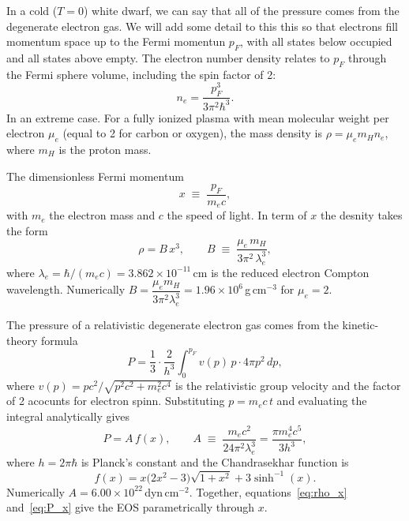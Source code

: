 \documentclass[12pt,letterpaper]{article}
\begin{document}
In a cold ($T = 0$) white dwarf, we can say that all of the pressure comes from the degenerate electron
gas. We will add some detail to this this so that electrons fill momentum space up to the Fermi momentun $p_F$, with all states below
occupied and all states above empty.
The electron number density relates to $p_F$ through the Fermi sphere volume,
including the spin factor of 2:
\begin{equation}
  n_e = \frac{p_F^3}{3\pi^2\hbar^3}.
  \label{eq:ne}
\end{equation}
In an extreme case. For a fully ionized plasma with mean molecular weight per electron $\mu_e$
(equal to 2 for carbon or oxygen), the mass density is $\rho = \mu_e m_H n_e$,
where $m_H$ is the proton mass.

The dimensionless Fermi momentum
\begin{equation}
  x \;\equiv\; \frac{p_F}{m_e c},
  \label{eq:xdef}
\end{equation}
with $m_e$ the electron mass and $c$ the speed of light.
In term of $x$ the desnity takes the form
\begin{equation}
  \rho = B\,x^3,
  \qquad
  B \;\equiv\; \frac{\mu_e\,m_H}{3\pi^2\,\lambda_e^3},
  \label{eq:rho_x}
\end{equation}
where $\lambda_e = \hbar/(m_e c) = 3.862 \times 10^{-11}$\,cm is the reduced electron
Compton wavelength.
Numerically $B = \dfrac{\mu_e m_H}{3\pi^2 \lambda_e^3} = 1.96 \times 10^6$\,g\,cm$^{-3}$ for $\mu_e = 2$.

The pressure of a relativistic degenerate electron gas comes from the kinetic-theory
formula
\begin{equation}
  P = \frac{1}{3}\cdot\frac{2}{h^3}\int_0^{p_F}
        v(p)\,p\cdot 4\pi p^2\,dp,
  \label{eq:Pintegral}
\end{equation}
where $v(p) = pc^2/\sqrt{p^2c^2 + m_e^2c^4}$ is the relativistic group velocity and
the factor of 2 acocunts for electron spinn.
Substituting $p = m_e c\,t$ and evaluating the integral analytically gives
\begin{equation}
  P = A\,f(x),
  \qquad
  A \;\equiv\; \frac{m_e c^2}{24\pi^2\lambda_e^3}
    = \frac{\pi m_e^4 c^5}{3h^3},
  \label{eq:P_x}
\end{equation}
where $h = 2\pi\hbar$ is Planck's constant and the Chandrasekhar function is
\begin{equation}
  f(x) = x\bigl(2x^2 - 3\bigr)\sqrt{1+x^2} + 3\sinh^{-1}(x).
  \label{eq:fx}
\end{equation}
Numerically $A = 6.00 \times 10^{22}$\,dyn\,cm$^{-2}$.
Together, equations~\eqref{eq:rho_x} and~\eqref{eq:P_x} give the EOS parametrically
through $x$.
\end{document}
